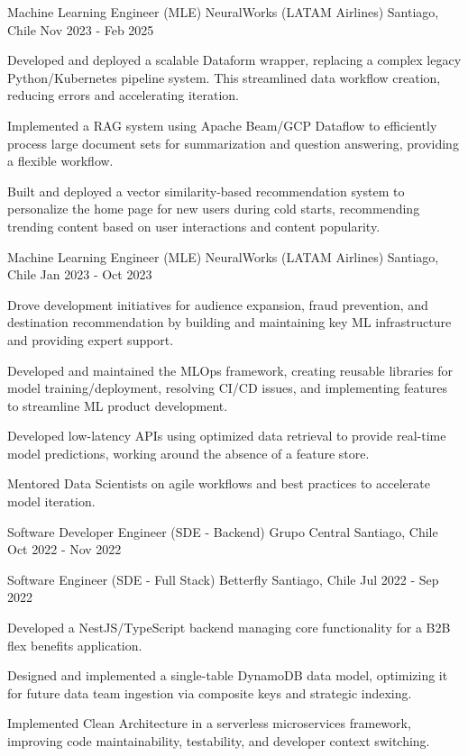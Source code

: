 \cventry
{Machine Learning Engineer (MLE)}
{NeuralWorks (LATAM Airlines)}
{Santiago, Chile}
{Nov 2023 - Feb 2025}
{
\begin{cvitems}
    \item Developed and deployed a scalable Dataform wrapper, replacing a complex legacy Python/Kubernetes pipeline system. This streamlined data workflow creation, reducing errors and accelerating iteration.
    \item Implemented a RAG system using Apache Beam/GCP Dataflow to efficiently process large document sets for summarization and question answering, providing a flexible workflow.
    \item Built and deployed a vector similarity-based recommendation system to personalize the home page for new users during cold starts, recommending trending content based on user interactions and content popularity.
\end{cvitems}
}

\cventry
{Machine Learning Engineer (MLE)}
{NeuralWorks (LATAM Airlines)}
{Santiago, Chile}
{Jan 2023 - Oct 2023}
{
\begin{cvitems}
    \item Drove development initiatives for audience expansion, fraud prevention, and destination recommendation by building and maintaining key ML infrastructure and providing expert support.
    \item Developed and maintained the MLOps framework, creating reusable libraries for model training/deployment, resolving CI/CD issues, and implementing features to streamline ML product development.
    \item Developed low-latency APIs using optimized data retrieval to provide real-time model predictions, working around the absence of a feature store.
    \item Mentored Data Scientists on agile workflows and best practices to accelerate model iteration.
\end{cvitems}
}

\cventry
{Software Developer Engineer (SDE - Backend)}
{Grupo Central}
{Santiago, Chile}
{Oct 2022 - Nov 2022}
{}

\cventry
{Software Engineer (SDE - Full Stack)}
{Betterfly}
{Santiago, Chile}
{Jul 2022 - Sep 2022}
{
\begin{cvitems}
    \item Developed a NestJS/TypeScript backend managing core functionality for a B2B flex benefits application.
    \item Designed and implemented a single-table DynamoDB data model, optimizing it for future data team ingestion via composite keys and strategic indexing.
    \item Implemented Clean Architecture in a serverless microservices framework, improving code maintainability, testability, and developer context switching.
\end{cvitems}
}

